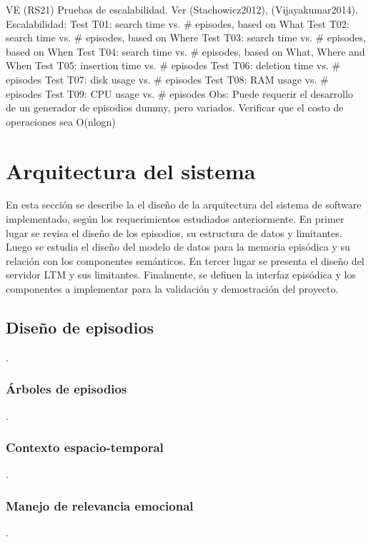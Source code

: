 VE (RS21)
Pruebas de escalabilidad. Ver (Stachowicz2012), (Vijayakumar2014).
Escalabilidad:
Test T01: search time vs. \# episodes, based on What
Test T02: search time vs. \# episodes, based on Where
Test T03: search time vs. \# episodes, based on When
Test T04: search time vs. \# episodes, based on What, Where and When
Test T05: insertion time vs. \# episodes
Test T06: deletion time vs. \# episodes 
Test T07: disk usage vs. \# episodes
Test T08: RAM usage vs. \# episodes
Test T09: CPU usage vs. \# episodes
Obs: Puede requerir el desarrollo de un generador de episodios dummy, pero variados.
Verificar que el costo de operaciones sea O(nlogn)


 
\section{Arquitectura del sistema}
 
 En esta sección se describe la el diseño de la arquitectura del sistema de software implementado, según los requerimientos estudiados anteriormente. En primer lugar se revisa el diseño de los episodios, su estructura de datos y limitantes. Luego se estudia el diseño del modelo de datos para la memoria episódica y su relación con los componentes semánticos. En tercer lugar se presenta el diseño del servidor LTM y sus limitantes. Finalmente, se definen la interfaz episódica y los componentes a implementar para la validación y demostración del proyecto.
 
 
\subsection{Diseño de episodios}
 .
 
\subsubsection{Árboles de episodios}
 .
 
\subsubsection{Contexto espacio-temporal}
 .

\subsubsection{Manejo de relevancia emocional}
 .

